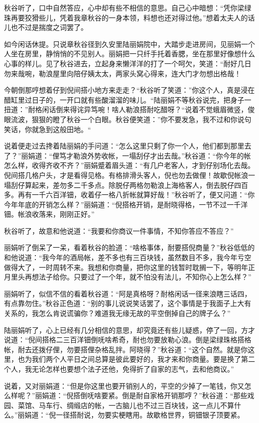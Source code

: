 \documentclass[12pt,UTF8]{ctexbook}
\begin{document}
{{{秋谷听了，口中自然答应，心中却有些不相信的意思。自己心中暗想：“凭你梁绿珠再要狡猾些儿，凭着我章秋谷的一身本领，料想也还对得过他。”想着太夫人的话儿也不过是揣度之词罢了。

如今闲话休提。只说章秋谷径到久安里陆丽娟院中，大踏步走进房间，见丽娟一个人坐在房里，静悄悄的不见别人。丽娟把一只纤手托着香腮，坐在那里好像想什么心事的样儿。见了秋谷进去，立起身来懒洋洋的打了一个呵欠，笑道：“耐好几日勿来哉啘，勒浪屋里向陪仔姨太太，两家头窝心得来，连大门才勿想出格哉！

今朝倒那哼想着仔到倪间搭小地方来走走？“秋谷听了笑道：”你这个人，真是浸在醋缸里过日子的，一开口就有些酸溜溜的味儿。“陆丽娟不等秋谷说完，把身子一扭道：”耐格闲话倒来得诧异笃啘！啥人勒浪搭耐吃醋呀？“说着不觉蛾眉微竖，俊眼流波，狠狠的瞪了秋谷一个白眼。秋谷便笑道：”你不要发急，我不过和你说句笑话，你就急到这般田地。“

说着便走过去搀着陆丽娟的手问道：“怎么这里只剩了你一个人，他们都到那里去了？”丽娟道：“俚笃才勒浪外势收帐，一塌刮仔才出去哉。”秋谷道：“你今年的帐怎么样，收得齐收不齐？”丽娟蹙着眉头道：“有几户老客人，才到仔别场化去哉。倪间搭几格户头，才是看得见格。有格排滑头客人，倪也勿去做俚！故歇倪帐浪一塌刮仔算起来，差勿多二千多点。除脱仔两格勿勒浪上海格客人，倒去脱仔四百多。再有一千六百洋钿，收着仔一格八折帐就算好哉！”秋谷听了，便又问道：“你今年年底的开销怎么样？”丽娟道：“倪搭格开销，是耐晓得格，一节不过一千洋钿。帐浪收落来，刚刚正好。”

秋谷听了，故意和他说道：“我要和你商议一件事情，不知你答应不答应？”

丽娟听了倒呆了一呆，看着秋谷的脸道：“啥格事体，耐要搭倪商量？”秋谷低低的和他说道：“我今年的酒局帐，差不多也有三百块钱，虽然数目不多，我今年亏空做得大了，一时周转不来。我想和你商量，把你这里的钱暂时耽搁一下，等明年正月里头再想法子给你。只要过了一个年，就不怕没有法儿，不知你心上怎么样？”

丽娟听了，似信不信的看着秋谷道：“阿是真格呀？耐格闲话一径来浪瞎三话四，有点靠勿住。”秋谷正色道：“别的事儿说说笑话罢了，这个事情是于我面子上大有关系的，我怎么肯说谎骗你？难道我无缘无故的平空倒掉自己的牌子么？”

陆丽娟听了，心上已经有几分相信的意思，却究竟还有些儿疑惑，停了一回，方才说道：“倪间搭格二三百洋钿倒呒啥希奇，耐也勿要放勒心浪。倒是梁绿珠格搭格帐，耐去还拨仔俚，勿要搭俚杂格乱拌。阿晓得？”秋谷道：“这个自然。就是你这里，也为我们两个人平日之间总算是彼此要好的，我才来和你商量。要是换了第二个人，我无论怎样也要想个法子还他，免得折了自家的志气，去和他商议。”

说着，又对丽娟道：“但是你这里也要开销别人的，平空的少掉了一笔钱，你又怎么样呢？”丽娟道：“倪搭倒呒啥要紧。倒是耐自家格开销那哼？”秋谷道：“那些戏园、菜馆、马车行、绸缎店的帐，一古脑儿也不过三百块钱，这一点儿不算什么。”丽娟道：“倪一径搭耐说，勿要实梗瞎用。故歇格世界，铜钿银子顶要紧。

}}}
\end{document}
